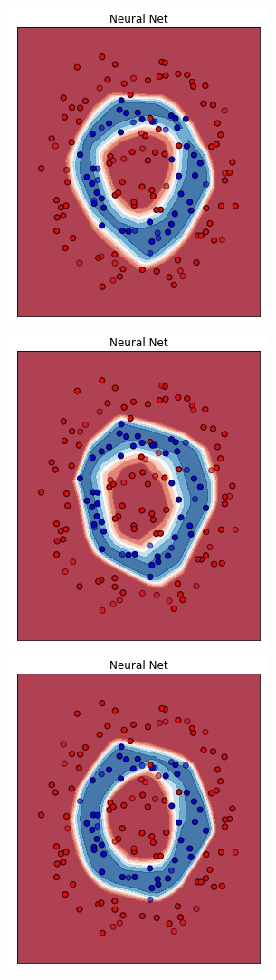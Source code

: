 \documentclass[12pt,a4paper]{report}
\begin{document}
\begin{figure}[H]
 \includegraphics[scale = 0.35]{images/circle+-rnd-log./4}
 \\
 \includegraphics[scale = 0.35]{images/circle+-rnd-log./5}
 \includegraphics[scale = 0.35]{images/circle+-rnd-log./6}

\end{figure}
\end{document}
